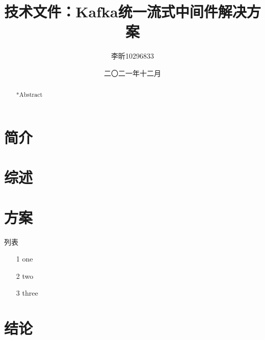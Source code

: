 \def\doctitle{Kafka统一流式中间件解决方案}
\def\docsecurity{秘密}
\def\docdate{二〇二一年十二月}
\def\docauthor{李昕10296833}






\title{\vspace{-2em}技术文件：\doctitle\vspace{-0.7em}}
\author{\docauthor}
\date{\vspace{-0.7em}\docdate\vspace{-0.7em}}

\maketitle
\tableofcontents

\begin{abstract}
{*Abstract}
\end{abstract}


\section{简介}
\section{综述}
\section{方案}
列表
\begin{itemize}

\item[1] one
\item[2] two
\item[3] three

\end{itemize}
\section{结论}






